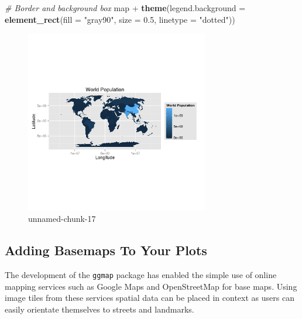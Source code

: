 \documentclass[]{article}
\newenvironment{Shaded}{}{}
\newcommand{\KeywordTok}[1]{\textcolor[rgb]{0.00,0.44,0.13}{\textbf{{#1}}}}
\newcommand{\DataTypeTok}[1]{\textcolor[rgb]{0.56,0.13,0.00}{{#1}}}
\newcommand{\FloatTok}[1]{\textcolor[rgb]{0.25,0.63,0.44}{{#1}}}
\newcommand{\StringTok}[1]{\textcolor[rgb]{0.25,0.44,0.63}{{#1}}}
\newcommand{\CommentTok}[1]{\textcolor[rgb]{0.38,0.63,0.69}{\textit{{#1}}}}
\newcommand{\NormalTok}[1]{{#1}}
\let\Oldincludegraphics\includegraphics
\renewcommand{\includegraphics}[1]{\Oldincludegraphics[width=8cm]{#1}}
\begin{document}
\begin{Shaded}
\begin{Highlighting}[]

\CommentTok{# Border and background box}
\NormalTok{map + }\KeywordTok{theme}\NormalTok{(}\DataTypeTok{legend.background =} \KeywordTok{element_rect}\NormalTok{(}\DataTypeTok{fill =} \StringTok{"gray90"}\NormalTok{, }\DataTypeTok{size =} \FloatTok{0.5}\NormalTok{, }\DataTypeTok{linetype =} \StringTok{"dotted"}\NormalTok{))}
\end{Highlighting}
\end{Shaded}
\begin{figure}[htbp]
\centering
\includegraphics{figure/unnamed-chunk-174.png}
\caption{unnamed-chunk-17}
\end{figure}

\subsection{Adding Basemaps To Your Plots}

The development of the \texttt{ggmap} package has enabled the simple use
of online mapping services such as Google Maps and OpenStreetMap for
base maps. Using image tiles from these services spatial data can be
placed in context as users can easily orientate themselves to streets
and landmarks.
\end{document}
